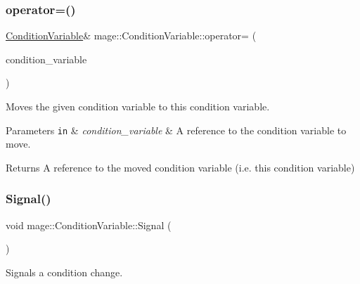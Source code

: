 \subsubsection{\texorpdfstring{operator=()}{operator=()}\hspace{0.1cm}{\footnotesize\ttfamily [2/2]}}
{\footnotesize\ttfamily \hyperlink{structmage_1_1_condition_variable}{Condition\+Variable}\& mage\+::\+Condition\+Variable\+::operator= (\begin{DoxyParamCaption}\item[{\hyperlink{structmage_1_1_condition_variable}{Condition\+Variable} \&\&}]{condition\+\_\+variable }\end{DoxyParamCaption})\hspace{0.3cm}{\ttfamily [delete]}}

Moves the given condition variable to this condition variable.


\begin{DoxyParams}[1]{Parameters}
\mbox{\tt in}  & {\em condition\+\_\+variable} & A reference to the condition variable to move. \\
\hline
\end{DoxyParams}
\begin{DoxyReturn}{Returns}
A reference to the moved condition variable (i.\+e. this condition variable) 
\end{DoxyReturn}
\hypertarget{structmage_1_1_condition_variable_ad48673a4f7ea2a28c7ddc77222e5d8cc}{}\label{structmage_1_1_condition_variable_ad48673a4f7ea2a28c7ddc77222e5d8cc} 
\subsubsection{\texorpdfstring{Signal()}{Signal()}}
{\footnotesize\ttfamily void mage\+::\+Condition\+Variable\+::\+Signal (\begin{DoxyParamCaption}{ }\end{DoxyParamCaption})\hspace{0.3cm}{\ttfamily [noexcept]}}

Signals a condition change. \hypertarget{structmage_1_1_condition_variable_a40e853cf65b0c3cb3788d2b8a45448af}{}\label{structmage_1_1_condition_variable_a40e853cf65b0c3cb3788d2b8a45448af} 
